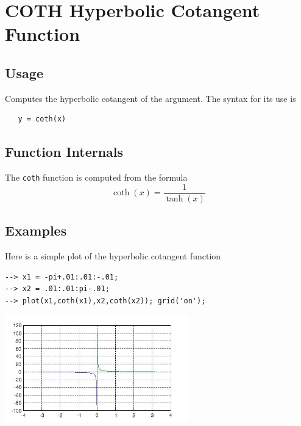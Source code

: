 \section{COTH Hyperbolic Cotangent Function}

\subsection{Usage}

Computes the hyperbolic cotangent of the argument.
The syntax for its use is
\begin{verbatim}
   y = coth(x)
\end{verbatim}
\subsection{Function Internals}

The \verb|coth| function is computed from the formula
\[
   \coth(x) = \frac{1}{\tanh(x)}
\]
\subsection{Examples}

Here is a simple plot of the hyperbolic cotangent function
\begin{verbatim}
--> x1 = -pi+.01:.01:-.01;
--> x2 = .01:.01:pi-.01;
--> plot(x1,coth(x1),x2,coth(x2)); grid('on');
\end{verbatim}


\centerline{\includegraphics[width=8cm]{cothplot}}

